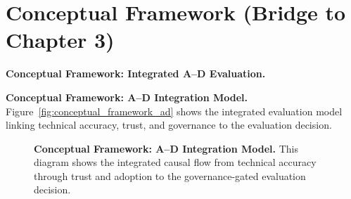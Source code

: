 \section{Conceptual Framework (Bridge to Chapter 3)}

\noindent\textbf{Conceptual Framework: Integrated A--D Evaluation.}

\noindent\textbf{Conceptual Framework: A--D Integration Model.} Figure~\ref{fig:conceptual_framework_ad} shows the integrated evaluation model linking technical accuracy, trust, and governance to the evaluation decision.

\begin{figure}[!htbp]
\centering
\noindent\textbf{Conceptual Framework: A--D Integration Model.} This diagram shows the integrated causal flow from technical accuracy through trust and adoption to the governance-gated evaluation decision.


\end{figure}
